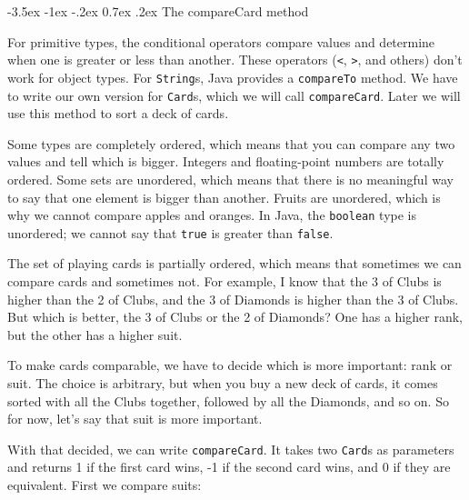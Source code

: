 \documentclass[12pt]{book}
\makeatletter
\theoremstyle{exercise}
\newcommand{\java}[1]{\verb"#1"}
\renewcommand{\section}{\@startsection {section}{1}{\z@}%
    {-3.5ex \@plus -1ex \@minus -.2ex}%
    {0.7ex \@plus.2ex}%
    {\normalfont\Large\bfseries}}
\newcommand{\java}[1]{\lstinline{#1}} %
\makeatother
\begin{document}


\section{The compareCard method}
\label{compare}


For primitive types, the conditional operators compare values and determine when one is greater or less than another.
These operators (\java{<}, \java{>}, and others) don't work for object types.
For \java{String}s, Java provides a \java{compareTo} method.
We have to write our own version for \java{Card}s, which we will call \java{compareCard}.
Later we will use this method to sort a deck of cards.


Some types are completely ordered, which means that you can compare any two values and tell which is bigger.
Integers and floating-point numbers are totally ordered.
Some sets are unordered, which means that there is no meaningful way to say that one element is bigger than another.
Fruits are unordered, which is why we cannot compare apples and oranges.
In Java, the \java{boolean} type is unordered; we cannot say that \java{true} is greater than \java{false}.

The set of playing cards is partially ordered, which means that sometimes we can compare cards and sometimes not.
For example, I know that the 3 of Clubs is higher than the 2 of Clubs, and the 3 of Diamonds is higher than the 3 of Clubs.
But which is better, the 3 of Clubs or the 2 of Diamonds?
One has a higher rank, but the other has a higher suit.


To make cards comparable, we have to decide which is more important: rank or suit.
The choice is arbitrary, but when you buy a new deck of cards, it comes sorted with all the Clubs together, followed by all the Diamonds, and so on.
So for now, let's say that suit is more important.

With that decided, we can write \java{compareCard}.
It takes two \java{Card}s as parameters and returns 1 if the first card wins, -1 if the second card wins, and 0 if they are equivalent.
First we compare suits:
\end{document}
